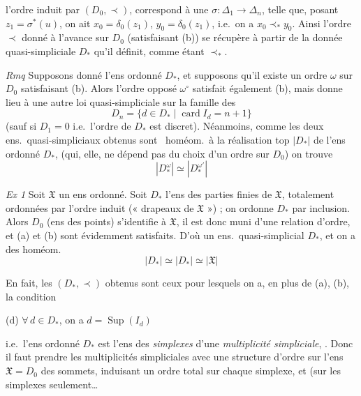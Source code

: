 \documentclass[11pt,a4paper]{article}
\begin{document}
l'ordre induit par $(D_0, \prec)$,  correspond à une
\struck{\ill{}}  $\sigma : \Delta_1 \to \Delta_n$, telle
que, posant $z_1 = \sigma^*(u)$, on ait $x_0 = \delta_0(z_1)$, $y_0 =
\delta_0(z_1)$, i.e.\ on a $x_0 \prec_* y_0$.
Ainsi l'ordre $\prec$ donné à l'avance sur $D_0$ (satisfaisant (b)) se
récupère à partir de la donnée quasi-simpliciale $D_*$ qu'il définit,
comme étant $\prec_*$.

\emph{Rmq} Supposons donné l'ens ordonné $D_*$, 
et supposons qu'il existe un ordre $\omega$ sur $D_0$ satisfaisant (b).
Alors l'ordre opposé $\omega^\circ$ satisfait également (b), mais donne
lieu à une autre loi quasi-simpliciale sur la famille des
\[
  D_n = \lbrace d \in D_* \mid \operatorname{card} I_d = n+1 \rbrace
\]
(sauf si $D_1 = 0$ i.e.\ l'ordre de $D_*$ est discret). Néanmoins, comme
les  deux ens.\ quasi-simpliciaux obtenus
sont \ homéom.\ à la réalisation top $|D_*|$ de l'ens
ordonné $D_*$, (qui, elle, ne dépend pas du choix d'un ordre sur $D_0$)
on trouve   
\[
  |D_*^\omega| \simeq |D_*^{\omega'}|
\]

\emph{Ex 1} Soit $\mathfrak{X}$ un ens ordonné. Soit $D_*$ l'ens des
parties finies de $\mathfrak{X}$, totalement ordonnées par l'ordre induit
(« drapeaux de $\mathfrak{X}$ ») ; on ordonne $D_*$ par inclusion. Alors
$D_0$ (ens des points) s'identifie à $\mathfrak{X}$, il est
 donc muni d'une relation d'ordre, et (a) et (b) sont
évidemment satisfaits. D'où un ens.\ quasi-simplicial $D_*$, et on a des
homéom.\ 
\[
  |D_*| \simeq |D_*| \simeq |\mathfrak{X}|
\]

En fait, les $(D_*, \prec)$ obtenus sont ceux pour lesquels on a, en plus
de (a), (b),  la condition

(d) $\forall\, d \in D_*$, on a $d = \operatorname{Sup}(I_d)$

i.e.\ l'ens ordonné $D_*$ est l'ens des \emph{simplexes} 
d'une \emph{multiplicité simpliciale},  . Donc il faut prendre les multiplicités simpliciales
avec une structure d'ordre sur l'ens $\mathfrak{X} = D_0$ des sommets,
induisant un ordre total sur chaque simplexe, et 
 (sur les simplexes
seulement…
\end{document}

